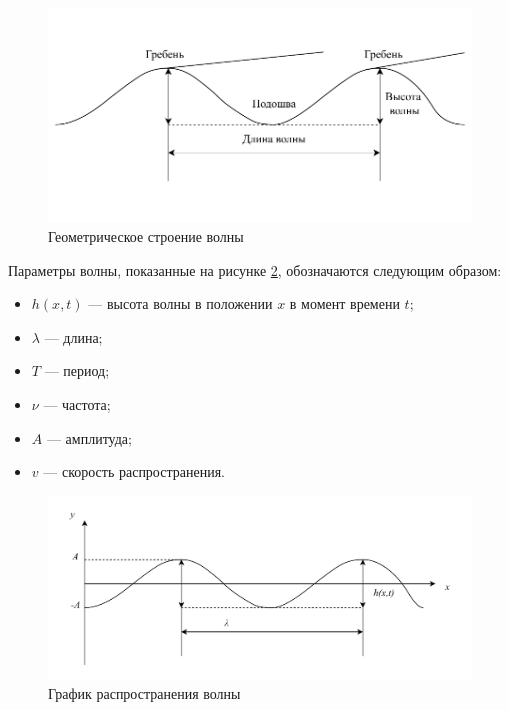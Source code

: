 \begin{figure}[H]
	\begin{center}
		\includegraphics[scale=0.8]{img/wave.pdf}
	\end{center}
	\captionsetup{justification=centering}
	\caption{Геометрическое строение волны}
	\label{img:wave}
\end{figure}

Параметры волны, показанные на рисунке \ref{img:math-wave}, обозначаются следующим образом:

\begin{itemize}
	\item $h(x,t)$ --- высота волны в положении $x$ в момент времени $t$;
	\item $\lambda$ --- длина;
	\item $T$ --- период;
	\item $\nu$ --- частота;
	\item $A$ --- амплитуда;
	\item $v$ --- скорость распространения.
\end{itemize}

\begin{figure}[H]
	\begin{center}
		\includegraphics[scale=0.8]{img/math-wave.pdf}
	\end{center}
	\captionsetup{justification=centering}
	\caption{График распространения волны}
	\label{img:math-wave}
\end{figure}

